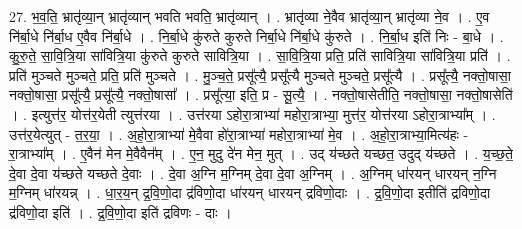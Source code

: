 \documentclass[17pt]{extarticle}
\begin{document}
27. भ॒व॒ति॒ भ्रातृ॑व्या॒न् भ्रातृ॑व्यान् भवति भवति॒ भ्रातृ॑व्यान् । . भ्रातृ॑व्या ने॒वैव भ्रातृ॑व्या॒न् भ्रातृ॑व्या ने॒व । . ए॒व नि॑र्बा॒धे नि॑र्बा॒ध ए॒वैव नि॑र्बा॒धे । . नि॒र्बा॒धे कु॑रुते कुरुते निर्बा॒धे नि॑र्बा॒धे कु॑रुते । . नि॒र्बा॒ध इति॑ निः - बा॒धे । . कु॒रु॒ते॒ सा॒वि॒त्रि॒या सा॑वित्रि॒या कु॑रुते कुरुते सावित्रि॒या । . सा॒वि॒त्रि॒या प्रति॒ प्रति॑ सावित्रि॒या सा॑वित्रि॒या प्रति॑ । . प्रति॑ मुञ्चते मुञ्चते॒ प्रति॒ प्रति॑ मुञ्चते । . मु॒ञ्च॒ते॒ प्रसू᳚त्यै॒ प्रसू᳚त्यै मुञ्चते मुञ्चते॒ प्रसू᳚त्यै । . प्रसू᳚त्यै॒ नक्तो॒षासा॒ नक्तो॒षासा॒ प्रसू᳚त्यै॒ प्रसू᳚त्यै॒ नक्तो॒षासा᳚ । . प्रसू᳚त्या॒ इति॒ प्र - सू॒त्यै॒ । . नक्तो॒षासेतीति॒ नक्तो॒षासा॒ नक्तो॒षासेति॑ । . इत्युत्त॑र॒ योत्त॑र॒येती त्युत्त॑रया । . उत्त॑रया ऽहोरा॒त्राभ्या॑ महोरा॒त्राभ्या॒ मुत्त॑र॒ योत्त॑रया ऽहोरा॒त्राभ्या᳚म् । . उत्त॑र॒येत्युत् - त॒र॒या॒ । . अ॒हो॒रा॒त्राभ्या॑ मे॒वैवा हो॑रा॒त्राभ्या॑ महोरा॒त्राभ्या॑ मे॒व । . अ॒हो॒रा॒त्राभ्या॒मित्य॑हः - रा॒त्राभ्या᳚म् । . ए॒वैन॑ मेन मे॒वैवैन᳚म् । . ए॒न॒ मुदु दे॑न मेन॒ मुत् । . उद् य॑च्छते यच्छत॒ उदुद् य॑च्छते । . य॒च्छ॒ते॒ दे॒वा दे॒वा य॑च्छते यच्छते दे॒वाः । . दे॒वा अ॒ग्नि म॒ग्निम् दे॒वा दे॒वा अ॒ग्निम् । . अ॒ग्निम् धा॑रयन् धारयन् न॒ग्नि म॒ग्निम् धा॑रयन्न् । . धा॒र॒य॒न् द्र॒वि॒णो॒दा द्र॑विणो॒दा धा॑रयन् धारयन् द्रविणो॒दाः । . द्र॒वि॒णो॒दा इतीति॑ द्रविणो॒दा द्र॑विणो॒दा इति॑ । . द्र॒वि॒णो॒दा इति॑ द्रविणः - दाः । \newline
\end{document}
